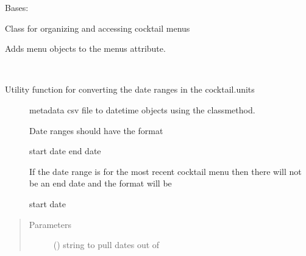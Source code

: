 \documentclass[letterpaper,10pt,english]{sphinxmanual}
\begin{document}
\begin{fulllineitems}
\label{\detokenize{polo.utils:polo.utils.io_utils.BarTender}}
Bases: 

Class for organizing and accessing cocktail menus

\begin{fulllineitems}
\label{\detokenize{polo.utils:polo.utils.io_utils.BarTender.add_menus_from_metadata}}
Adds menu objects to the menus attribute.

\end{fulllineitems}


\begin{fulllineitems}
\label{\detokenize{polo.utils:polo.utils.io_utils.BarTender.date_range_parser}}~\begin{description}
\item[{Utility function for converting the date ranges in the cocktail.units}] \leavevmode
metadata csv file to datetime objects using the 
classmethod.

Date ranges should have the format

start date \sphinxhyphen{} end date

If the date range is for the most recent cocktail menu then there
will not be an end date and the format will be

start date \sphinxhyphen{}

\end{description}
\begin{quote}\begin{description}
\item[{Parameters}] \leavevmode
{} () \textendash{} string to pull dates out of


\end{description}
\end{quote}
\end{fulllineitems}
\end{fulllineitems}
\end{document}
